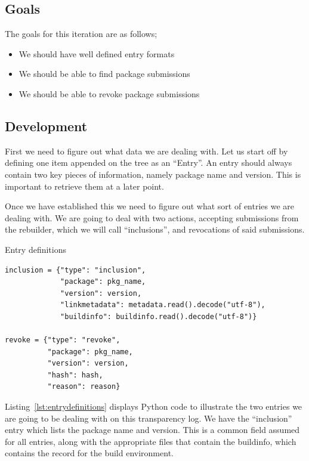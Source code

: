 \documentclass[../Main/thesis.tex]{subfiles}
\begin{document}
\subsection*{Goals}%
\label{sub:fourth_iteration_goals}

The goals for this iteration are as follows;

\begin{itemize}
    \item We should have well defined entry formats
    \item We should be able to find package submissions
    \item We should be able to revoke package submissions
\end{itemize}

\subsection*{Development}%
\label{sub:fourth_iteration_development}
First we need to figure out what data we are dealing with. Let us start off by
defining one item appended on the tree as an ``Entry''. An entry should always
contain two key pieces of information, namely package name and version. This is
important to retrieve them at a later point.

Once we have established this we need to figure out what sort of entries we are
dealing with. We are going to deal with two actions, accepting submissions from
the rebuilder, which we will call ``inclusions'', and revocations of said
submissions. 

\begin{listing}[H]
\caption{Entry definitions}
\label{lst:entrydefinitions}
\begin{verbatim}
inclusion = {"type": "inclusion",
             "package": pkg_name,
             "version": version,
             "linkmetadata": metadata.read().decode("utf-8"),
             "buildinfo": buildinfo.read().decode("utf-8")}

revoke = {"type": "revoke",
          "package": pkg_name,
          "version": version,
          "hash": hash,
          "reason": reason}
\end{verbatim}
\end{listing}

Listing~\ref{lst:entrydefinitions} displays Python code to illustrate the
two entries we are going to be dealing with on this transparency log. We have
the ``inclusion'' entry which lists the package name and version. This is a
common field assumed for all entries, along with the appropriate files that
contain the buildinfo, which contains the record for the build environment. 
\end{document}
